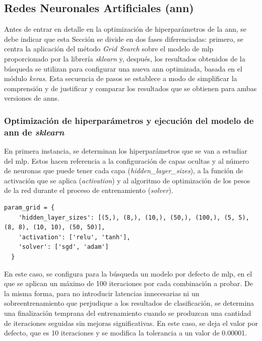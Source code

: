 \subsection{Redes Neuronales Artificiales (\acrshort{ann})}
\label{sec:ann}

Antes de entrar en detalle en la optimización de hiperparámetros de la \gls{ann}, se debe indicar que esta Sección se divide en dos fases diferenciadas: primero, se centra la aplicación del método \textit{Grid Search} sobre el modelo de \gls{mlp} proporcionado por la librería \textit{sklearn} y, después, los resultados obtenidos de la búsqueda  se utilizan para configurar una nueva \gls{ann} optimizada, basada en el módulo \textit{keras}. Esta secuencia de pasos se establece a modo de simplificar la comprensión y de justificar y comparar los resultados que se obtienen para ambas versiones de \gls{ann}s.

\subsubsection{Optimización de hiperparámetros y ejecución del modelo de \acrshort{ann} de \textit{sklearn}}

En primera instancia, se determinan los hiperparámetros que se van a estudiar del \gls{mlp}. Estos hacen referencia a la configuración de capas ocultas y al número de neuronas que puede tener cada capa (\textit{hidden\_layer\_sizes}), a la función de activación que se aplica (\textit{activation}) y al algoritmo de optimización de los pesos de la red durante el proceso de entrenamiento (\textit{solver}). \cite{mlp}

\vspace{3mm}

\begin{lstlisting}[style=Python, caption={Cuadrícula de parámetros MLP}]
  param_grid = {
    'hidden_layer_sizes': [(5,), (8,), (10,), (50,), (100,), (5, 5), (8, 8), (10, 10), (50, 50)],  
    'activation': ['relu', 'tanh'],
    'solver': ['sgd', 'adam']
  }
\end{lstlisting}

\vspace{3mm}

En este caso, se configura para la búsqueda un modelo por defecto de \gls{mlp}, en el que se aplican un máximo de 100 iteraciones por cada combinación a probar. De la misma forma, para no introducir latencias innecesarias ni un sobreentrenamiento que perjudique a los resultados de clasificación, se determina una finalización temprana del entrenamiento cuando se produzcan una cantidad de iteraciones seguidas sin mejoras significativas. En este caso, se deja el valor por defecto, que es 10 iteraciones y se modifica la tolerancia a un valor de 0.00001.

